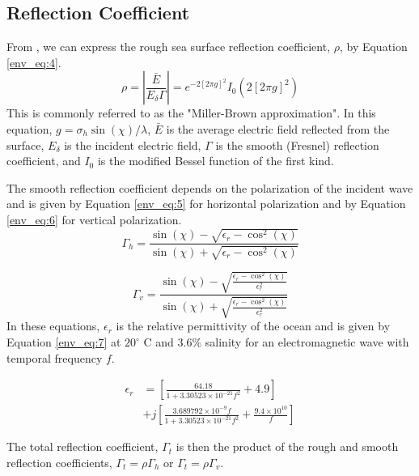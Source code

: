 \subsection{Reflection Coefficient}
From \cite{miller_reflection}, we can express the rough sea surface reflection coefficient, $\rho$, by Equation \ref{env_eq:4}. 
  \begin{equation}
  \label{env_eq:4}
\rho = \left|\frac{\bar{E}}{E_\delta \Gamma} \right| = e^{-2\left[2\pi g \right]^2}I_0\left( 2\left[2\pi g \right]^2\right) 
\end{equation}
This is commonly referred to as the "Miller-Brown approximation". In this equation, $g = \sigma_h\sin(\chi)/\lambda$, $\bar{E}$ is the average electric field reflected from the surface, $E_\delta$ is the incident electric field, $\Gamma$ is the smooth (Fresnel) reflection coefficient, and $I_0$ is the modified Bessel function of the first kind.

The smooth reflection coefficient depends on the polarization of the incident wave and is given by Equation \ref{env_eq:5} for horizontal polarization and by Equation \ref{env_eq:6} for vertical polarization.
  \begin{equation}
  \label{env_eq:5}
 \Gamma_h = \frac{\sin(\chi)- \sqrt{\epsilon_r - \cos^2(\chi)}}{\sin(\chi) + \sqrt{\epsilon_r - \cos^2(\chi)}}
  \end{equation}
  
  \begin{equation}
  \label{env_eq:6}
 \Gamma_v = \frac{\sin(\chi)- \sqrt{\frac{\epsilon_r - \cos^2(\chi)}{\epsilon_r^2}}}{\sin(\chi) + \sqrt{\frac{\epsilon_r - \cos^2(\chi)}{\epsilon_r^2}}}
  \end{equation}
In these equations, $\epsilon_r$ is the relative permittivity of the ocean and is given by Equation \ref{env_eq:7} at $20^{\circ}$ C and $3.6\%$ salinity for an electromagnetic wave with temporal frequency $f$. 
  
\begin{equation}
\begin{aligned}
  \label{env_eq:7}
\epsilon_r &= \left[\frac{64.18}{1 + 3.30523\times 10^{-21}f^2} + 4.9 \right] \\
&+ j\left[\frac{3.689792\times 10^{-9}f}{1 + 3.30523\times 10^{-21}f^2} + \frac{9.4\times 10^{10}}{f} \right]
\end{aligned}
  \end{equation}
  
The total reflection coefficient, $\Gamma_t$ is then the product of the rough and smooth reflection coefficients, $\Gamma_t = \rho\Gamma_h$ or $\Gamma_t = \rho\Gamma_v$.

